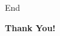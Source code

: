       \begin{frame}{End}
	\begin{minipage}[c]{\linewidth}
	\centering
	\textbf{\Huge Thank You!}
	\end{minipage}
      \end{frame}
 \begin{frame}[t,plain]
	\titlepage
\end{frame}


 

